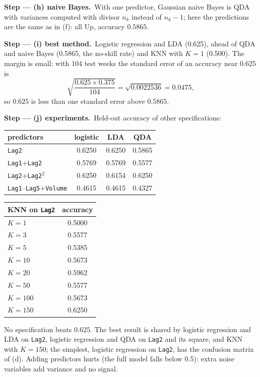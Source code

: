 \documentclass[11pt,a4paper]{article}
\numberwithin{equation}{questao}   %
\newcommand{\passo}[2]{\par\smallskip\noindent\textbf{Step --- #1.}~#2}
\begin{document}
\begin{sol}
\passo{(h) naive Bayes}{With one predictor, Gaussian naive Bayes is QDA with variances computed
with divisor $n_k$ instead of $n_k-1$; here the predictions are the same as in (f): all Up,
accuracy $0.5865$.}

\passo{(i) best method}{Logistic regression and LDA (0.625), ahead of QDA and naive Bayes
(0.5865, the no-skill rate) and KNN with $K=1$ (0.500). The margin is small: with 104 test weeks
the standard error of an accuracy near $0.625$ is
\begin{equation}\label{eq:I413-se}
\sqrt{\frac{0.625\times0.375}{104}}=\sqrt{0.0022536}=0.0475,
\end{equation}
so $0.625$ is less than one standard error above $0.5865$.}

\passo{(j) experiments}{Held-out accuracy of other specifications:
\begin{center}\begin{tabular}{lccc}\toprule
predictors & logistic & LDA & QDA\\\midrule
\texttt{Lag2} & 0.6250 & 0.6250 & 0.5865\\
\texttt{Lag1}+\texttt{Lag2} & 0.5769 & 0.5769 & 0.5577\\
\texttt{Lag2}+\texttt{Lag2}$^2$ & 0.6250 & 0.6154 & 0.6250\\
\texttt{Lag1}--\texttt{Lag5}+\texttt{Volume} & 0.4615 & 0.4615 & 0.4327\\\bottomrule\end{tabular}
\qquad
\begin{tabular}{lc}\toprule
KNN on \texttt{Lag2} & accuracy\\\midrule
$K=1$ & 0.5000\\ $K=3$ & 0.5577\\ $K=5$ & 0.5385\\ $K=10$ & 0.5673\\ $K=20$ & 0.5962\\
$K=50$ & 0.5577\\ $K=100$ & 0.5673\\ $K=150$ & 0.6250\\\bottomrule\end{tabular}\end{center}
No specification beats $0.625$. The best result is shared by logistic regression and LDA on
\texttt{Lag2}, logistic regression and QDA on \texttt{Lag2} and its square, and KNN with $K=150$; the
simplest, logistic regression on \texttt{Lag2}, has the confusion matrix of (d). Adding predictors
hurts (the full model falls below 0.5): extra noise variables add variance and no signal.}


\end{sol}
\end{document}

